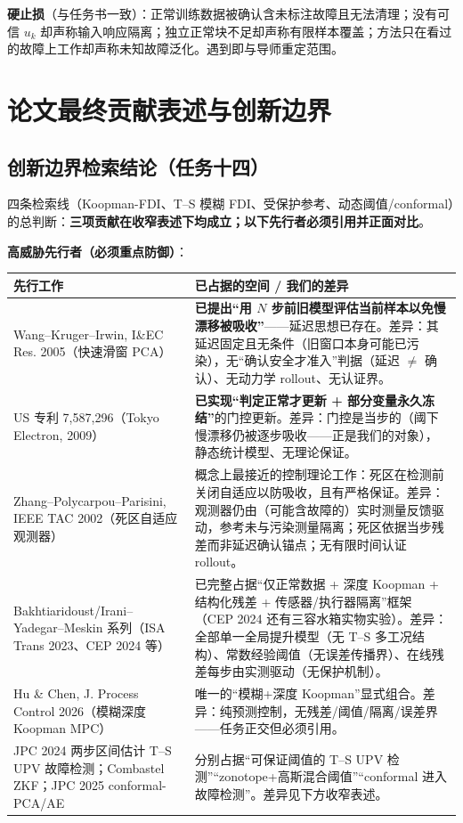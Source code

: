 \documentclass[11pt,a4paper]{ctexart}
\theoremstyle{remark}
\begin{document}
\textbf{硬止损}（与任务书一致）：正常训练数据被确认含未标注故障且无法清理；没有可信 $u_k$ 却声称输入响应隔离；独立正常块不足却声称有限样本覆盖；方法只在看过的故障上工作却声称未知故障泛化。遇到即与导师重定范围。

\section{论文最终贡献表述与创新边界}

\subsection{创新边界检索结论（任务十四）}

四条检索线（Koopman-FDI、T--S 模糊 FDI、受保护参考、动态阈值/conformal）的总判断：\textbf{三项贡献在收窄表述下均成立；以下先行者必须引用并正面对比}。

\textbf{高威胁先行者（必须重点防御）}：
\begin{center}
\small
\begin{tabular}{p{}p{}}
\toprule
先行工作 & 已占据的空间 / 我们的差异 \\
\midrule
Wang--Kruger--Irwin, I\&EC Res. 2005（快速滑窗 PCA） & \textbf{已提出“用 $N$ 步前旧模型评估当前样本以免慢漂移被吸收”}——延迟思想已存在。差异：其延迟固定且无条件（旧窗口本身可能已污染），无“确认安全才准入”判据（延迟 $\ne$ 确认）、无动力学 rollout、无认证界。 \\
US 专利 7{,}587{,}296（Tokyo Electron, 2009） & \textbf{已实现“判定正常才更新 + 部分变量永久冻结”}的门控更新。差异：门控是当步的（阈下慢漂移仍被逐步吸收——正是我们的对象），静态统计模型、无理论保证。 \\
Zhang--Polycarpou--Parisini, IEEE TAC 2002（死区自适应观测器） & 概念上最接近的控制理论工作：死区在检测前关闭自适应以防吸收，且有严格保证。差异：观测器仍由（可能含故障的）实时测量反馈驱动，参考未与污染测量隔离；死区依据当步残差而非延迟确认锚点；无有限时间认证 rollout。 \\
Bakhtiaridoust/Irani--Yadegar--Meskin 系列（ISA Trans 2023、CEP 2024 等） & 已完整占据“仅正常数据 + 深度 Koopman + 结构化残差 + 传感器/执行器隔离”框架（CEP 2024 还有三容水箱实物实验）。差异：全部单一全局提升模型（无 T--S 多工况结构）、常数经验阈值（无误差传播界）、在线残差每步由实测驱动（无保护机制）。 \\
Hu \& Chen, J. Process Control 2026（模糊深度 Koopman MPC） & 唯一的“模糊+深度 Koopman”显式组合。差异：纯预测控制，无残差/阈值/隔离/误差界——任务正交但必须引用。 \\
JPC 2024 两步区间估计 T--S UPV 故障检测；Combastel ZKF；JPC 2025 conformal-PCA/AE & 分别占据“可保证阈值的 T--S UPV 检测”“zonotope+高斯混合阈值”“conformal 进入故障检测”。差异见下方收窄表述。 \\
\bottomrule
\end{tabular}
\end{center}
\end{document}

